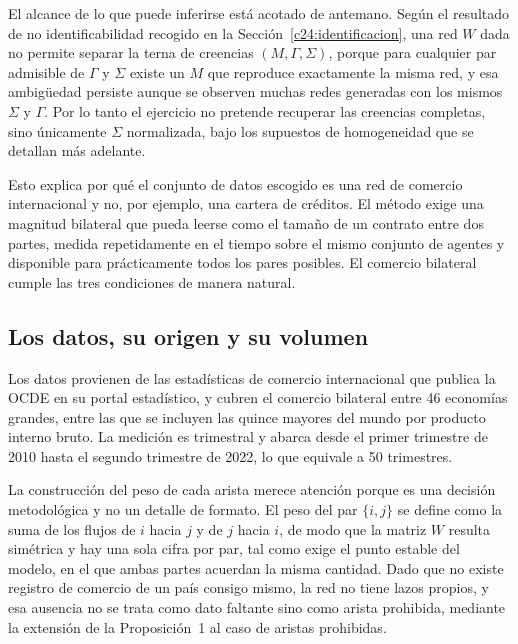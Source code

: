 El alcance de lo que puede inferirse está acotado de antemano. Según el resultado de no identificabilidad recogido en la Sección~\ref{c24:identificacion}, una red $W$ dada no permite separar la terna de creencias $(M,\Gamma,\Sigma)$, porque para cualquier par admisible de $\Gamma$ y $\Sigma$ existe un $M$ que reproduce exactamente la misma red, y esa ambigüedad persiste aunque se observen muchas redes generadas con los mismos $\Sigma$ y $\Gamma$. Por lo tanto el ejercicio no pretende recuperar las creencias completas, sino únicamente $\Sigma$ normalizada, bajo los supuestos de homogeneidad que se detallan más adelante.

Esto explica por qué el conjunto de datos escogido es una red de comercio internacional y no, por ejemplo, una cartera de créditos. El método exige una magnitud bilateral que pueda leerse como el tamaño de un contrato entre dos partes, medida repetidamente en el tiempo sobre el mismo conjunto de agentes y disponible para prácticamente todos los pares posibles. El comercio bilateral cumple las tres condiciones de manera natural.

\subsection{Los datos, su origen y su volumen}
\label{c4:ocde-datos}

Los datos provienen de las estadísticas de comercio internacional que publica la OCDE en su portal estadístico, y cubren el comercio bilateral entre 46 economías grandes, entre las que se incluyen las quince mayores del mundo por producto interno bruto. La medición es trimestral y abarca desde el primer trimestre de 2010 hasta el segundo trimestre de 2022, lo que equivale a 50 trimestres.

La construcción del peso de cada arista merece atención porque es una decisión metodológica y no un detalle de formato. El peso del par $\{i,j\}$ se define como la suma de los flujos de $i$ hacia $j$ y de $j$ hacia $i$, de modo que la matriz $W$ resulta simétrica y hay una sola cifra por par, tal como exige el punto estable del modelo, en el que ambas partes acuerdan la misma cantidad. Dado que no existe registro de comercio de un país consigo mismo, la red no tiene lazos propios, y esa ausencia no se trata como dato faltante sino como arista prohibida, mediante la extensión de la Proposición~1 al caso de aristas prohibidas.

